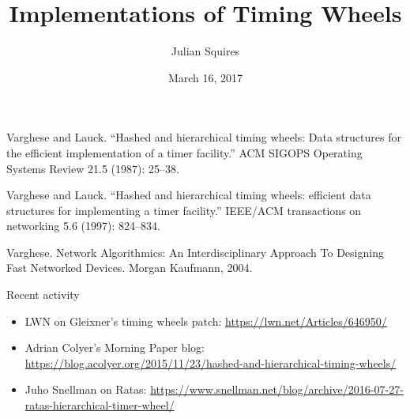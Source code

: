\documentclass{beamer}
\title{Implementations of Timing Wheels}
\author{Julian Squires}
\institute{AdGear Technologies, Inc.}
\date{March 16, 2017}
\begin{document}
\begin{frame}
  \titlepage{}
\end{frame}

\begin{frame}
  Varghese and Lauck. ``Hashed and hierarchical timing
wheels: Data structures for the efficient implementation of a timer
facility.'' ACM SIGOPS Operating Systems Review 21.5 (1987): 25--38.

\vspace{1.5em}

Varghese and Lauck. ``Hashed and hierarchical timing wheels: efficient
data structures for implementing a timer facility.''  IEEE/ACM
transactions on networking 5.6 (1997): 824--834.

\vspace{1.5em}

Varghese. Network Algorithmics: An Interdisciplinary Approach
To Designing Fast Networked Devices. Morgan Kaufmann, 2004.
\end{frame}

\begin{frame}{Recent activity}
  \begin{itemize}
  \item LWN on Gleixner's timing wheels patch:
    \hspace{1em}\hyperlink{https://lwn.net/Articles/646950/}{https://lwn.net/Articles/646950/}

  \item Adrian Colyer's Morning Paper blog:
    \hspace{1em}\hyperlink{https://blog.acolyer.org/2015/11/23/hashed-and-hierarchical-timing-wheels/}{https://blog.acolyer.org/2015/11/23/hashed-and-hierarchical-timing-wheels/}

  \item Juho Snellman on Ratas:
    \hspace{1em}\hyperlink{https://www.snellman.net/blog/archive/2016-07-27-ratas-hierarchical-timer-wheel/}{https://www.snellman.net/blog/archive/2016-07-27-ratas-hierarchical-timer-wheel/}
  \end{itemize}
\end{frame}
\end{document}
